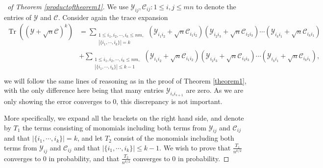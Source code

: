 \documentclass[12pt, reqno]{amsart}
\theoremstyle{definition}
\theoremstyle{remark}
\numberwithin{equation}{section}
\begin{document}
\begin{proof}[\proofname\ of Theorem \ref{productoftheorem1}] We use
$\mathcal{Y}_{ij},\mathcal{C}_{ij}:1\leq i,j\leq mn$ to denote the entries of $\mathcal{Y}$ and $\mathcal{C}$.
Consider again the trace expansion
\begin{equation}\begin{aligned}
\operatorname{Tr}((\mathcal{Y}+\sqrt{n}\mathcal{C})^k)&=\sum_{\substack{1\leq i_1,i_2,\cdots,i_k\leq nm,\\|\{i_1,\cdots,i_k\}|=k}}(\mathcal{Y}_{i_1i_2}+\sqrt{n}\mathcal{C}_{i_1i_2})(\mathcal{Y}_{i_2i_3}+\sqrt{n}\mathcal{C}_{i_2i_3})\cdots (\mathcal{Y}_{i_ki_1}+\sqrt{n}\mathcal{C}_{i_ki_1})
\\&+\sum_{\substack{1\leq i_1,i_2,\cdots,i_k\leq nm,\\ |\{i_1,\cdots,i_k\}|\leq k-1}} (\mathcal{Y}_{i_1i_2}+\sqrt{n}\mathcal{C}_{i_1i_2})(\mathcal{Y}_{i_2i_3}+\sqrt{n}\mathcal{C}_{i_2i_3})\cdots (\mathcal{Y}_{i_ki_1}+\sqrt{n}\mathcal{C}_{i_ki_1}),\\
\end{aligned}
\end{equation}
we will follow the same lines of reasoning as in the proof of Theorem \ref{theorem1}, with the only difference here being that many entries $\mathcal{Y}_{i_si_{s+1}}$ are zero. As we are only showing the error converges to 0, this discrepancy is not important.


More specifically, we expand all the brackets on the right hand side, and denote by $T_1$ the terms consisting of monomials including both terms from $\mathcal{Y}_{ij}$ and $\mathcal{C}_{ij}$ and that $|\{i_1,\cdots,i_k\}|=k$, and let $T_2$ consist of the monomials including both terms from $\mathcal{Y}_{ij}$ and $\mathcal{C}_{ij}$ and that $|\{i_1,\cdots,i_k\}|\leq k-1$. We wish to prove that $\frac{T_1}{n^{k/2}}$ converges to $0$ in probability, and that $\frac{T_2}{n^{k/2}}$ converges to $0$ in probability.


\end{proof}
\end{document}
